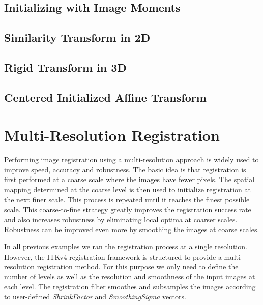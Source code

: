\subsection{Initializing with Image Moments}
\label{sec:InitializingRegistrationWithMoments}




\subsection{Similarity Transform in 2D}
\label{sec:SimilarityRegistrationIn2D}




\subsection{Rigid Transform in 3D}
\label{sec:RigidRegistrationIn3D}





\subsection{Centered Initialized Affine Transform}
\label{sec:CenteredAffineTransform}





\section{Multi-Resolution Registration}
\label{sec:MultiResolutionRegistration}
Performing image registration using a multi-resolution approach is widely used
to improve speed, accuracy and robustness. The basic idea is that registration
is first performed at a coarse scale where the images have fewer pixels.
The spatial mapping determined at the coarse level is then used to initialize
registration at the next finer scale. This process is repeated until it
reaches the finest possible scale. This coarse-to-fine strategy greatly
improves the registration success rate and also increases robustness
by eliminating local optima at coarser scales. Robustness can be improved
even more by smoothing the images at coarse scales.

In all previous examples we ran the registration process at a single resolution. However,
the ITKv4 registration framework is structured to provide a multi-resolution registration
method. For this purpose we only need to define the number of levels as well as the
resolution and smoothness of the input images at each level. The registration filter
smoothes and subsamples the images according to user-defined \emph{ShrinkFactor} and
\emph{SmoothingSigma} vectors.

